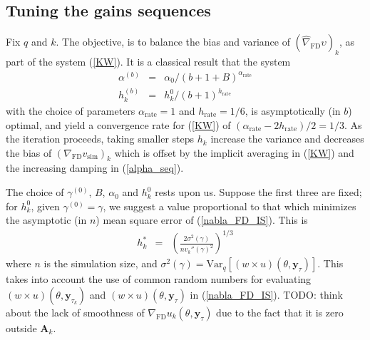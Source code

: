 \documentclass[11pt]{article}
\begin{document}

\subsection{Tuning the gains sequences}
Fix $q$ and $k$. The objective, is to balance the bias and variance
of $(\widehat{\nabla}_{\mathrm{\scriptscriptstyle FD}} \upsilon)_k$,
as part of the system (\ref{KW}). It is a classical result that the
system
\begin{eqnarray}\label{alpha_seq}
\alpha^{(b)}&=& \alpha_0/(b+1+B)^{\alpha_{\mathrm{
\scriptscriptstyle rate}}}\\\label{h_seq} h_k^{(b)}&=&
h_k^{0}/(b+1)^{h_{\mathrm{\scriptscriptstyle rate}}}
\end{eqnarray}with the choice of parameters $\alpha_{\mathrm{\scriptscriptstyle rate}}=1$ and
$h_{\mathrm{\scriptscriptstyle rate}}=1/6$, is asymptotically (in
$b$) optimal, and yield a convergence rate for (\ref{KW}) of
$(\alpha_{\mathrm{\scriptscriptstyle rate}}-2
h_{\mathrm{\scriptscriptstyle rate}})/2=1/3$. As the iteration
proceeds, taking smaller steps $h_k$ increase the variance and
decreases the bias of $(\nabla_{\mathrm{\scriptscriptstyle
FD}}v_{\mathrm{sim}})_k$ which is offset by the implicit averaging
in (\ref{KW}) and the increasing damping in (\ref{alpha_seq}).

The choice of $\gamma^{(0)}$, $B$, $\alpha_0$ and $h_k^{0}$ rests
upon us. Suppose the first three are fixed; for $h_k^0$, given
$\gamma^{(0)}=\gamma$, we suggest a value proportional to that which
minimizes the asymptotic (in $n$) mean square error of
(\ref{nabla_FD_IS}). This is
\begin{eqnarray}\label{h_opt} h_k^{*} &=&
\left(\frac{2 \sigma^2(\gamma)}{n v_{k}''(\gamma)^2}\right)^{1/3}
\end{eqnarray}where $n$ is the simulation size, and
$\sigma^2(\gamma)=\mathrm{Var}_{q}[(w\times
u)(\theta,\mathbf{y}_{\tau})]$.  This takes into account the use of
common random numbers for evaluating $(w\times
u)(\theta,\textbf{y}_{\tau_k})$ and $(w \times
u)(\theta,\textbf{y}_{\tau})$ in (\ref{nabla_FD_IS}). TODO: think
about the lack of smoothness of $\nabla_{\mathrm{FD}}
u_k(\theta,\mathbf{y}_{\tau})$ due to the fact that it is zero
outside $\mathbf{A}_k$.
\end{document}
